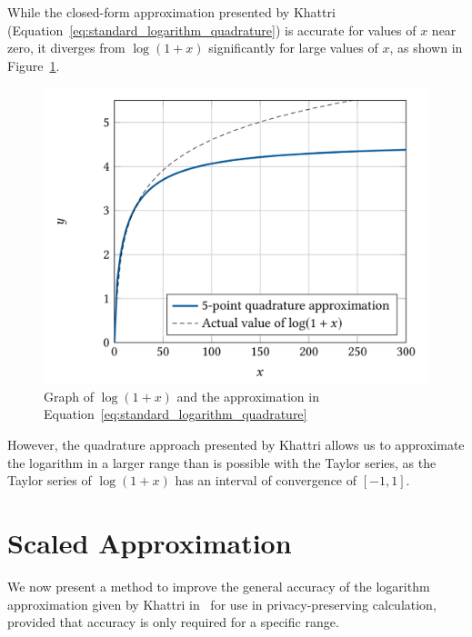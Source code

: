 While the closed-form approximation presented by Khattri (Equation~\ref{eq:standard_logarithm_quadrature}) is accurate for values of $x$ near zero, it diverges from $\log{\left(1+x\right)}$ significantly for large values of $x$, as shown in Figure~\ref{fig:standard_logarithm_quadrature}.
\begin{figure}[!ht]
	\centering
    \includegraphics[width=12cm]{figures/graph_log_a2.png}
	\caption{Graph of $\log{\left(1+x\right)}$ and the approximation in Equation~\ref{eq:standard_logarithm_quadrature}}
	\label{fig:standard_logarithm_quadrature}
\end{figure}

However, the quadrature approach presented by Khattri allows us to approximate the logarithm in a larger range than is possible with the Taylor series, as the Taylor series of $\log\left(1+x\right)$ has an interval of convergence of $[-1,1]$.

\section{Scaled Approximation}
\label{sec:logarithm_approximation}
We now present a method to improve the general accuracy of the logarithm approximation given by Khattri in~\cite{khattri_new_2009} for use in privacy-preserving calculation, provided that accuracy is only required for a specific range.

